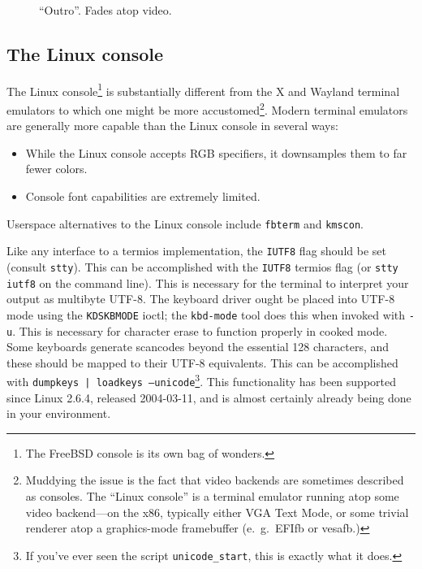 \documentclass[letterpaper,10pt]{article}
\newenvironment{denseitemize}{
  \begin{itemize}
      \setlength{\itemsep}{0pt}
}{
  \end{itemize}
}
\begin{document}
\begin{figure}
\begin{minipage}{0.45\textwidth}
    \caption{``Outro''. Fades atop video.}
  \end{minipage}\hfill
\end{figure}

\pagebreak
\cleardoublepage


\pagebreak
\cleardoublepage
\begin{appendices}


\pagebreak
\cleardoublepage


\pagebreak
\cleardoublepage


\section{The Linux console}
The Linux console\footnote{The FreeBSD console is its own bag of wonders.} is
substantially different from the X and Wayland terminal emulators to which one
might be more accustomed\footnote{Muddying the issue is the fact that video
backends are sometimes described as consoles. The ``Linux console'' is a terminal
emulator running atop some video backend---on the x86, typically either VGA
Text Mode, or some trivial renderer atop a graphics-mode framebuffer
(e.\ g.\ EFIfb or vesafb.)}. Modern terminal emulators are generally more capable
than the Linux console in several ways:

\begin{denseitemize}
\item{While the Linux console accepts RGB specifiers, it downsamples them to
    far fewer colors.}
\item{Console font capabilities are extremely limited.}
\end{denseitemize}

Userspace alternatives to the Linux console include \texttt{fbterm} and
\texttt{kmscon}.

Like any interface to a termios\cite{termios} implementation, the \texttt{IUTF8}
flag should be set (consult \texttt{stty}). This can be accomplished with the
\texttt{IUTF8} termios flag (or \texttt{stty iutf8} on the command line). This
is necessary for the terminal to interpret your output as multibyte UTF-8. The
keyboard driver ought be placed into UTF-8 mode using the \texttt{KDSKBMODE}
ioctl; the \texttt{kbd-mode} tool does this when invoked with \texttt{-u}.
This is necessary for character erase to function properly in cooked mode. Some
keyboards generate scancodes beyond the essential 128 characters, and these
should be mapped to their UTF-8 equivalents. This can be accomplished with
\texttt{dumpkeys | loadkeys --unicode}\footnote{If you've ever seen the script
\texttt{unicode\_start}, this is exactly what it does.}. This functionality has
been supported since Linux 2.6.4, released 2004-03-11, and is almost certainly
already being done in your environment.


\end{appendices}
\end{document}
